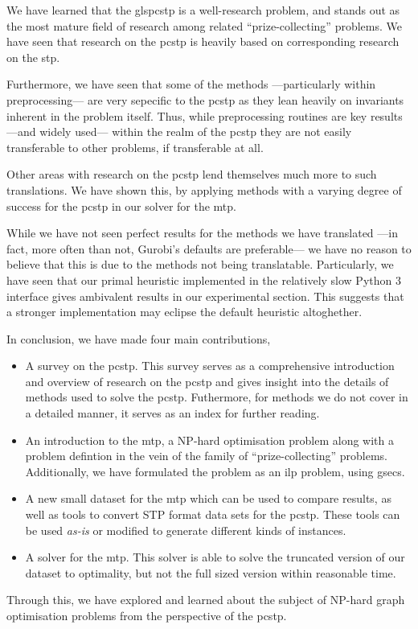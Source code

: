 We have learned that the gls{pcstp}
is a well-research problem, and stands out as the most mature field of
research among related ``prize-collecting'' problems.
We have seen that research on the \gls{pcstp} is heavily based on corresponding
research on the \gls{stp}.

Furthermore, we have seen that some of the methods
---particularly within preprocessing---
are very sepecific to the \gls{pcstp} as they lean heavily on
invariants inherent in the problem itself. Thus, while preprocessing routines
are key results ---and widely used--- within the realm of the \gls{pcstp}
they are not easily transferable to other problems, if transferable at all.

Other areas with research on the \gls{pcstp} lend themselves much more to such
translations. We have shown this, by applying methods
with a varying degree of success for the
\gls{pcstp} in our solver for the \gls{mtp}.

While we have not seen perfect results for the methods we have translated
---in fact, more often than not, Gurobi's defaults are preferable---
we have no reason to believe that this is due to the methods not being
translatable. Particularly, we have seen that our primal heuristic implemented
in the relatively slow Python 3 interface gives ambivalent results in our experimental
section. This suggests that a stronger implementation may eclipse the default heuristic
altoghether.

In conclusion, we have made four main contributions,
\begin{itemize}
\item A survey on the \gls{pcstp}. This survey serves as a comprehensive introduction
  and overview of research on the \gls{pcstp} and gives insight into the details of
  methods used to solve the \gls{pcstp}. Futhermore, for methods we do not cover
  in a detailed manner, it serves as an index for further reading.
\item An introduction to the \acrlong{mtp}, a NP-hard optimisation problem along with
  a problem defintion in the vein of the family of ``prize-collecting'' problems.
  Additionally, we have formulated the problem as an \gls{ilp} problem, using \glspl{gsec}.
\item A new small dataset for the \gls{mtp} which can be used to compare results, as well
  as tools to convert STP format data sets for the \gls{pcstp}. These tools can be used
  \textit{as-is} or modified to generate different kinds of instances.
\item A solver for the \gls{mtp}. This solver is able to solve the truncated version of
  our dataset to optimality, but not the full sized version within reasonable time.
\end{itemize}

Through this, we have explored and learned about the subject of
NP-hard graph optimisation problems from
the perspective of the \acrlong{pcstp}.



